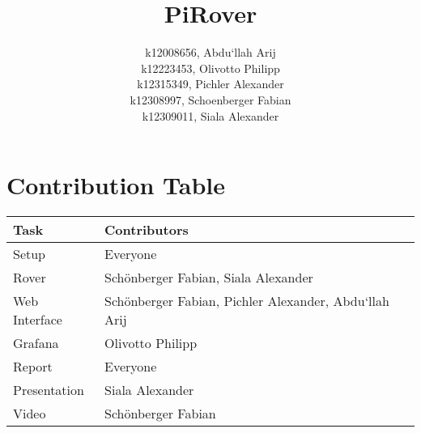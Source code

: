 \documentclass[12pt]{article}
\begin{document}
    \title{PiRover}

    \date{}
    \author{
        k12008656, Abdu`llah Arij\\
        k12223453, Olivotto Philipp\\
        k12315349, Pichler Alexander\\
        k12308997, Schoenberger Fabian\\
        k12309011, Siala Alexander
    }

    \maketitle
    \tableofcontents

    \vspace{-0.25cm}
    \section*{Contribution Table}
    \vspace{-0.3cm}
    \begin{flushleft}
        \begin{minipage}{0.6\textwidth}
            \begin{table}[H]
                \centering
                \renewcommand{\arraystretch}{1.3}
                \begin{tabular}{|l|p{10cm}|}
                    \hline
                    \textbf{Task} & \textbf{Contributors} \\
                    \hline
                    Setup & Everyone \\
                    Rover & Schönberger Fabian, Siala Alexander \\
                    Web Interface & Schönberger Fabian, Pichler Alexander, Abdu`llah Arij  \\
                    Grafana & Olivotto Philipp \\
                    Report & Everyone \\
                    Presentation & Siala Alexander \\
                    Video & Schönberger Fabian \\
                    \hline
                \end{tabular}\label{tab:table}
            \end{table}
        \end{minipage}
    \end{flushleft}

    \newpage

    
    
    
    
    
    
    
    
\end{document}
